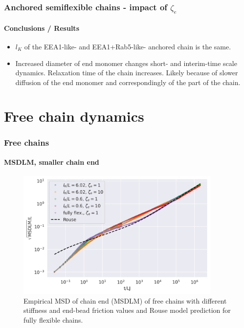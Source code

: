 \documentclass[handout]{beamer}
\begin{document}

\begin{frame}
    \frametitle{Anchored semiflexible chains - impact of $\zeta_e$}
    \framesubtitle{Conclusions / Results}
    \begin{itemize}
        \item $l_K$ of the EEA1-like- and EEA1+Rab5-like- anchored chain is the same.
        \item Increased diameter of end monomer changes short- and interim-time scale 
        dynamics. Relaxation time of the chain increases. Likely because of slower
        diffusion of the end monomer and correspondingly of the part of the chain.
    \end{itemize}
\end{frame}


\section{Free chain dynamics}


\begin{frame}
    \frametitle{Free chains}
    \framesubtitle{MSDLM, smaller chain end}
    \begin{figure}[h]
        \includegraphics[width=0.9\textwidth]{17+18+19+20-exp-msd-fm-log.png}
        \caption{
            Empirical MSD of chain end (MSDLM) of free chains
            with different stiffness and end-bead friction values and
            Rouse model prediction for fully flexible chains.
        }
    \end{figure}
\end{frame}
\end{document}
